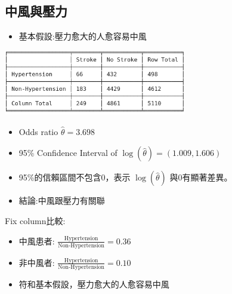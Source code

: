 \subsection{中風與壓力}
\begin{itemize}
    \item 基本假設:壓力愈大的人愈容易中風
\end{itemize}
\begin{center}
    \includegraphics[width=8cm]{./two_by_two_table/hypert_stroke.png}
\end{center}
\begin{itemize}
    \item Odds ratio $\hat{\theta}=3.698$
    \item 95\% Confidence Interval of $\log{(\hat{\theta})}=(1.009, 1.606)$
    \item 95\%的信賴區間不包含0，表示 $\log{(\hat{\theta})}$ 與0有顯著差異。
    \item 結論:中風跟壓力有關聯
\end{itemize}
Fix column比較:
\begin{itemize}
    \item 中風患者: $\frac{\text{Hypertension}}{\text{Non-Hypertension}}=0.36$
    \item 非中風者: $\frac{\text{Hypertension}}{\text{Non-Hypertension}}=0.10$
    \item 符和基本假設，壓力愈大的人愈容易中風
\end{itemize}

